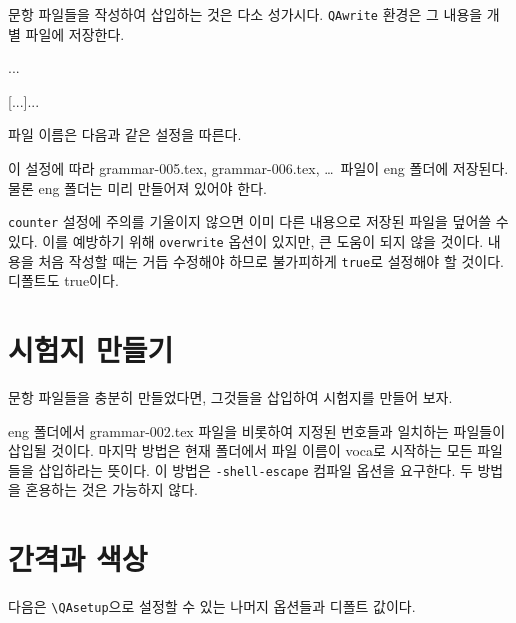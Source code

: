 \documentclass[a4paper]{oblivoir}
\begin{document}
문항 파일들을 작성하여 삽입하는 것은 다소 성가시다.
\texttt{QAwrite} 환경은 그 내용을 개별 파일에 저장한다.

\begin{boxedverbatim}
\begin{QAwrite}
\begin{premise}
... 
\end{premise}
[...]{...}
\end{QAwrite}
\end{boxedverbatim}

파일 이름은 다음과 같은 설정을 따른다.

\begin{boxedverbatim}
\end{boxedverbatim}

이 설정에 따라 grammar-005.tex, grammar-006.tex, \ldots\ 파일이 eng 폴더에 저장된다.
물론 eng 폴더는 미리 만들어져 있어야 한다.

\texttt{counter} 설정에 주의를 기울이지 않으면 이미 다른 내용으로 저장된 파일을 덮어쓸 수 있다.
이를 예방하기 위해 \texttt{overwrite} 옵션이 있지만, 큰 도움이 되지 않을 것이다.
내용을 처음 작성할 때는 거듭 수정해야 하므로 불가피하게 \texttt{true}로 설정해야 할 것이다.
디폴트도 true이다.

\section{시험지 만들기}

문항 파일들을 충분히 만들었다면, 그것들을 삽입하여 시험지를 만들어 보자.

\begin{boxedverbatim}
\end{boxedverbatim}

eng 폴더에서 grammar-002.tex 파일을 비롯하여 지정된 번호들과 일치하는 파일들이 삽입될 것이다.
마지막 방법은 현재 폴더에서 파일 이름이 voca로 시작하는 모든 파일들을 삽입하라는 뜻이다.
이 방법은 \texttt{-shell-escape} 컴파일 옵션을 요구한다.
두 방법을 혼용하는 것은 가능하지 않다.

\section{간격과 색상}

다음은 \verb|\QAsetup|으로 설정할 수 있는 나머지 옵션들과 디폴트 값이다.
\end{document}
